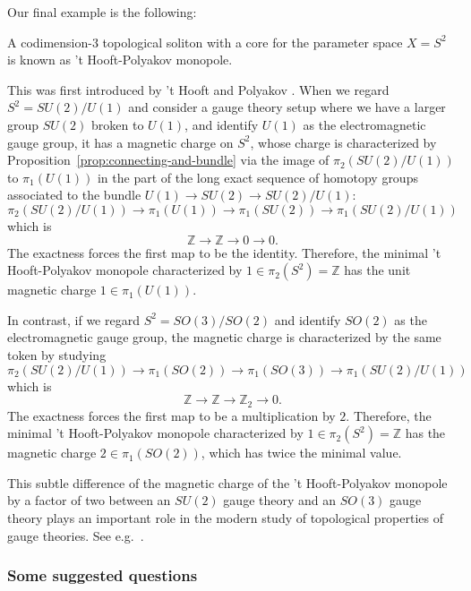 \documentclass[12pt]{article}
\numberwithin{equation}{section}
\numberwithin{figure}{section}
\theoremstyle{remark}
\def\bZ{\mathbb{Z}}
\begin{document}
Our final example is the following:
\begin{example}
A codimension-3 topological soliton with a core for the parameter space $X=S^2$
is known as 't Hooft-Polyakov monopole.
\end{example}
This was first introduced by 't Hooft \cite{tHooft:1974kcl} and Polyakov \cite{Polyakov:1974ek}.
When we regard $S^2=SU(2)/U(1)$
and consider a gauge theory setup where we have a larger group $SU(2)$ broken to $U(1)$,
and identify $U(1)$ as the electromagnetic gauge group,
it has a magnetic charge on $S^2$,
whose charge is characterized by Proposition~\ref{prop:connecting-and-bundle} 
via the image of $\pi_2(SU(2)/U(1))$ to $\pi_1(U(1))$ in the part of
 the long exact sequence of  homotopy groups associated to the bundle $U(1)\to SU(2)\to SU(2)/U(1)$: \begin{equation}
 \pi_2(SU(2)/U(1)) \to \pi_1(U(1)) \to \pi_1(SU(2))\to \pi_1(SU(2)/U(1))
\end{equation} which is \begin{equation}
 \bZ \to \bZ \to 0 \to 0.
\end{equation}
The exactness forces the first map to be the identity.
Therefore, the minimal 't Hooft-Polyakov monopole characterized by $1\in \pi_2(S^2)=\bZ$
has the unit magnetic charge $1\in \pi_1(U(1))$.

In contrast, if we regard $S^2=SO(3)/SO(2)$
and identify $SO(2)$ as the electromagnetic gauge group,
the magnetic charge is characterized by the same token by studying \begin{equation}
 \pi_2(SU(2)/U(1)) \to \pi_1(SO(2)) \to \pi_1(SO(3)) \to \pi_1(SU(2)/U(1))
\end{equation} which is \begin{equation}
 \bZ \to \bZ \to \bZ_2 \to 0.
\end{equation}
The exactness forces the first map to be a multiplication by $2$.
Therefore, the minimal 't Hooft-Polyakov monopole characterized by $1\in \pi_2(S^2)=\bZ$
has the magnetic charge $2\in \pi_1(SO(2))$, which has twice the minimal value.

This subtle difference of the magnetic charge of the 't Hooft-Polyakov monopole by a factor of two
between an $SU(2)$ gauge theory and an $SO(3)$ gauge theory
 plays an important role in the modern study of topological properties of gauge theories.
 See e.g.~\cite{Aharony:2013hda}.

\subsubsection{Some suggested questions}
\end{document}
